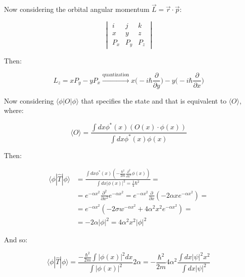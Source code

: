     Now considering the orbital angular momentum $\vec{L} =\vec{r}\cdot\vec{p}$:

    $$\begin{vmatrix}i&j&k\\x&y&z\\P_x&P_y&P_z\end{vmatrix}$$

    Then:

    $$L_z = xP_y - yP_x\xrightarrow[]{\text{quantization}}x\biggl(-i\hbar\frac{\partial}{\partial y}\biggr) - y\biggl(-i\hbar\frac{\partial}{\partial x}\biggr)$$

    Now considering $\langle \phi|O|\phi\rangle$ that specifies the state and that is equivalent to $\langle O\rangle$, where:

    $$\langle O\rangle = \frac{\int dx \phi^*(x)(O(x)\cdot\phi(x))}{\int dx\phi^*(x)\phi(x)}$$

    Then:

    \begin{align*}
      \langle\phi|\hat{T}|\phi\rangle &=\frac{\int dx\phi^*(x)(-\frac{\hbar^2}{2m}\frac{\partial^2}{\partial x^2}\phi(x))}{\int dx |\phi(x)|^2 = \frac{1}{4}\hbar^2}=\\
                                      &=e^{-\alpha x^2}\frac{\partial^2}{\partial x^2}e^{-\alpha x^2} = e^{-\alpha x^2}\frac{\partial}{\partial x}(-2\alpha xe^{-\alpha x^2}) =\\
                                      &=e^{-\alpha x^2}(-2\sigma w^{-\alpha x^2}+4\alpha^2x^2e^{-\alpha x^2})= \\
                                      &=-2\alpha|\phi|^2 = 4\alpha^2 x^2|\phi|^2
    \end{align*}

    And so:

    $$\langle\phi|\hat{T}|\phi\rangle = \frac{-\frac{\hbar^2}{2m}\int |\phi(x)|^2dx}{\int|\phi(x)|^2}2\alpha= - \frac{\hbar^2}{2m}4\alpha^2\frac{\int dx|\psi|^2x^2}{\int dx|\psi|^2}$$


